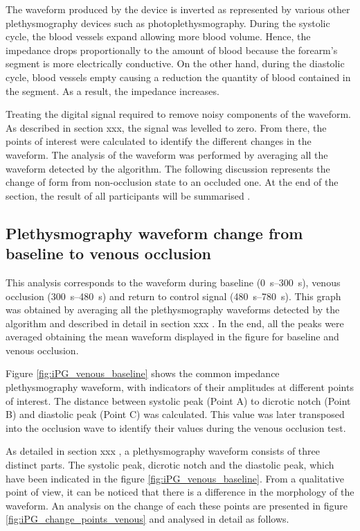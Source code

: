 The waveform produced by the device is inverted as represented by various other plethysmography devices such as photoplethysmography. During the systolic cycle, the blood vessels expand allowing more blood volume. Hence, the impedance drops proportionally to the amount of blood because the forearm's segment is more electrically conductive. On the other hand, during the diastolic cycle, blood vessels empty causing a reduction the quantity of blood contained in the segment. As a result, the impedance increases.  

Treating the digital signal required to remove noisy components of the waveform. As described in section xxx, the signal was levelled to zero.  From there, the points of interest were calculated to identify the different changes in the waveform. The analysis of the waveform was performed by averaging all the waveform detected by the algorithm. The following discussion represents the change of form from non-occlusion state to an occluded one. At the end of the section, the result of all participants will be summarised .

\subsection{Plethysmography waveform change from baseline to venous occlusion}
\label{section5.3.1}
This analysis corresponds to the waveform during baseline (\SIrange{0}{300}{\second}), venous occlusion (\SIrange{300}{480}{\second}) and return to control signal (\SIrange{480}{780}{\second}). This graph was obtained by averaging all the plethysmography waveforms detected by the algorithm and described in detail in section xxx . In the end, all the peaks were averaged obtaining the mean waveform displayed in the figure for baseline and venous occlusion.

Figure \ref{fig:iPG_venous_baseline} shows the common impedance plethysmography waveform, with indicators of their amplitudes at different points of interest. The distance between systolic peak (Point A) to dicrotic notch (Point B) and diastolic peak (Point C) was calculated. This value was later transposed into the occlusion wave to identify their values during the venous occlusion test.

As detailed in section xxx , a plethysmography waveform consists of three distinct parts. The systolic peak, dicrotic notch and the diastolic peak, which have been indicated in the figure \ref{fig:iPG_venous_baseline}. From a qualitative point of view, it can be noticed that there is a difference in the morphology of the waveform. An analysis on the change of each these points are presented in figure \ref{fig:iPG_change_points_venous} and analysed in detail as follows.


